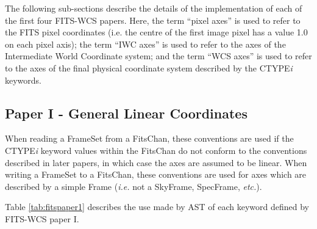 \documentclass[twoside,11pt]{starlink}
\begin{document}
The following sub-sections describe the details of the implementation of
each of the first four FITS-WCS papers. Here, the term ``pixel axes'' is
used to refer to the FITS pixel coordinates (i.e. the centre of the
first image pixel has a value 1.0 on each pixel axis); the term ``IWC
axes'' is used to refer to the axes of the Intermediate World Coordinate
system; and the term ``WCS axes'' is used to refer to the axes of the final
physical coordinate system described by the CTYPE\emph{i} keywords.

\subsection{Paper I - General Linear Coordinates}
When reading a FrameSet from a FitsChan, these conventions are used if the CTYPE\emph{i} keyword
values within the FitsChan do not conform to the conventions described in
later papers, in which case the axes are assumed to be linear. When
writing a FrameSet to a FitsChan, these conventions are used for axes
which are described by a simple Frame (\emph{i.e.} not a
SkyFrame, SpecFrame, \emph{etc.}).

Table \ref{tab:fitspaper1} describes the use made by AST of each keyword
defined by FITS-WCS paper I.
\end{document}
